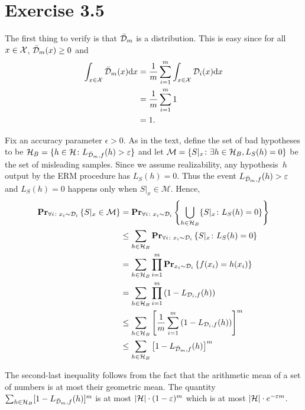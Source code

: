 \section*{Exercise 3.5}

The first thing to verify is that $\bar{\mathcal{D}}_m$ is a distribution. This is
easy since for all $x \in \mathcal{X}$, $\bar{\mathcal{D}}_m(x) \geq 0$ and
\begin{align*}
	\int_{x \in \mathcal{X}} \bar{\mathcal{D}}_m (x) \text{d} x & = \frac{1}{m} \sum_{i = 1}^m
	\int_{x \in \mathcal{X}} \mathcal{D}_i (x) \text{d} x \\
	& = \frac{1}{m} \sum_{i = 1}^m 1 \\
	& = 1.
\end{align*}

Fix an accuracy parameter $\epsilon > 0$. As in the text, define the set of bad
hypotheses to be $\mathcal{H}_{B} = \{h \in \mathcal{H} \colon L_{\bar{\mathcal{D}}_m, f}
(h) > \varepsilon\}$ and let $\mathcal{M} = \{S \vert_x \colon \exists h \in
\mathcal{H}_{B}, L_S(h) = 0\}$ be the set of misleading samples. Since we assume
realizability, any hypothesis~$h$ output by the ERM procedure has $L_S(h) =
0$. Thus the event $L_{\bar{\mathcal{D}}_m, f} (h) > \varepsilon$ and $L_S(h) = 0$
happens only when $S \vert_x \in \mathcal{M}$. Hence,
\begin{align*}
	\mathbf{Pr}_{\forall i \colon x_i \sim \mathcal{D}_i} \left \{ S \vert_x \in \mathcal{M} \right \}
	& = \mathbf{Pr}_{\forall i \colon x_i \sim \mathcal{D}_i} \left \{ \bigcup_{h \in \mathcal{H}_{B}}
			   \{S \vert_x \colon L_S(h) = 0\} \right \} \\
    & \leq \sum_{h \in \mathcal{H}_B}
    		\mathbf{Pr}_{\forall i \colon x_i \sim \mathcal{D}_i} \left \{ S \vert_x \colon L_S(h) = 0 \right \} \\
    & = \sum_{h \in \mathcal{H}_B}
    		\prod_{i = 1}^{m} \mathbf{Pr}_{x_i \sim \mathcal{D}_i} \left \{ f(x_i) = h(x_i) \right \} \\
    & =  \sum_{h \in \mathcal{H}_B}
    		\prod_{i = 1}^{m} \left ( 1 - L_{\mathcal{D}_i, f} (h) \right ) \\
    & \leq \sum_{h \in \mathcal{H}_B} \left [
            \frac{1}{m} \sum_{i = 1}^{m} \left ( 1 - L_{\mathcal{D}_i, f} (h) \right )
        \right ]^m \\
    & \leq \sum_{h \in \mathcal{H}_B} \left [ 1 - L_{\bar{\mathcal{D}}_{m}, f} (h)\right ]^m
\end{align*}

The second-last inequality follows from the fact that the arithmetic mean of a set of numbers
is at most their geometric mean. The quantity
$\sum_{h \in \mathcal{H}_B} [ 1 - L_{\bar{\mathcal{D}}_{m}, f} (h)]^m$
is at most $| \mathcal{H} | \cdot (1 - \varepsilon)^m $ which is at most
$| \mathcal{H} | \cdot e^{- \varepsilon m}$.


